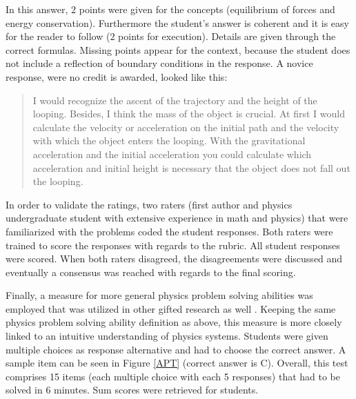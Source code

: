 \documentclass[]{interact}
\begin{document}
In this answer, $2$ points were given for the concepts (equilibrium of forces and energy conservation). Furthermore the student's answer is coherent and it is easy for the reader to follow ($2$ points for execution). Details are given through the correct formulas. Missing points appear for the context, because the student does not include a reflection of boundary conditions in the response. A novice response, were no credit is awarded, looked like this:
\begin{quote}
I would recognize the ascent of the trajectory and the height of the looping. Besides, I think the mass of the object is crucial. At first I would calculate the velocity or acceleration on the initial path and the velocity with which the object enters the looping. With the gravitational acceleration and the initial acceleration you could calculate which acceleration and initial height is necessary that the object does not fall out the looping.

\end{quote}

In order to validate the ratings, two raters (first author and physics undergraduate student with extensive experience in math and physics) that were familiarized with the problems coded the student responses. Both raters were trained to score the responses with regards to the rubric. All student responses were scored. When both raters disagreed, the disagreements were discussed and eventually a consensus was reached with regards to the final scoring.



Finally, a measure for more general physics problem solving abilities was employed that was utilized in other gifted research as well \cite{Heller.2007}. Keeping the same physics problem solving ability definition as above, this measure is more closely linked to an intuitive understanding of physics systems. Students were given multiple choices as response alternative and had to choose the correct answer. A sample item can be seen in Figure \ref{APT} (correct answer is C). Overall, this test comprises 15 items (each multiple choice with each 5 responses) that had to be solved in 6 minutes. Sum scores were retrieved for students.
\end{document}
